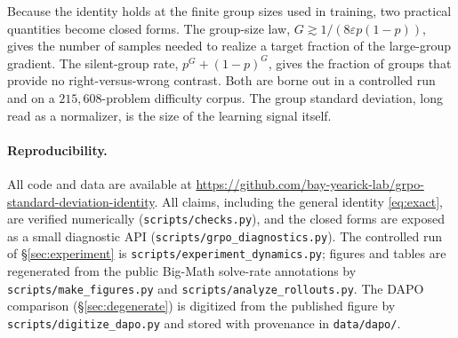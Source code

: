 \documentclass[11pt]{article}
\theoremstyle{plain}
\theoremstyle{definition}
\begin{document}
Because the identity holds at the finite group sizes used in training, two practical quantities become closed forms. The group-size law, $G\gtrsim1/(8\varepsilon p(1-p))$, gives the number of samples needed to realize a target fraction of the large-group gradient. The silent-group rate, $p^G+(1-p)^G$, gives the fraction of groups that provide no right-versus-wrong contrast. Both are borne out in a controlled run and on a $215{,}608$-problem difficulty corpus. The group standard deviation, long read as a normalizer, is the size of the learning signal itself.

\paragraph{Reproducibility.} \sloppy All code and data are available at \url{https://github.com/bay-yearick-lab/grpo-standard-deviation-identity}. All claims, including the general identity \eqref{eq:exact}, are verified numerically (\texttt{scripts/\allowbreak{}checks.py}), and the closed forms are exposed as a small diagnostic API (\texttt{scripts/\allowbreak{}grpo\_diagnostics.py}). The controlled run of \S\ref{sec:experiment} is \texttt{scripts/\allowbreak{}experiment\_dynamics.py}; figures and tables are regenerated from the public Big-Math solve-rate annotations by \texttt{scripts/\allowbreak{}make\_figures.py} and \texttt{scripts/\allowbreak{}analyze\_rollouts.py}. The DAPO comparison (\S\ref{sec:degenerate}) is digitized from the published figure by \texttt{scripts/\allowbreak{}digitize\_dapo.py} and stored with provenance in \texttt{data/dapo/}.



\end{document}

